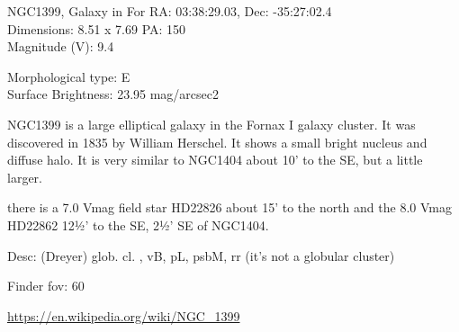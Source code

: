 \begin{block}{NGC1399, Galaxy in For}
    RA: 03:38:29.03, Dec: -35:27:02.4 \\ 
    Dimensions: 8.51 x 7.69 PA: 150 \\ 
    Magnitude (V): 9.4

    Morphological type: E \\ 
    Surface Brightness: 23.95 mag/arcsec2

    NGC1399 is a large elliptical galaxy in the Fornax I galaxy cluster. It was
    discovered in 1835 by William Herschel. It shows a small bright nucleus and
    diffuse halo. It is very similar to NGC1404 about 10' to the SE, but a
    little larger.

    there is a 7.0 Vmag field star HD22826 about 15' to the north and the 8.0
    Vmag HD22862 12½' to the SE, 2½' SE of NGC1404.

    Desc: (Dreyer) glob. cl. , vB, pL, psbM, rr (it's not a globular cluster) 

    Finder fov: 60 

    \url{https://en.wikipedia.org/wiki/NGC_1399} 
\end{block}
